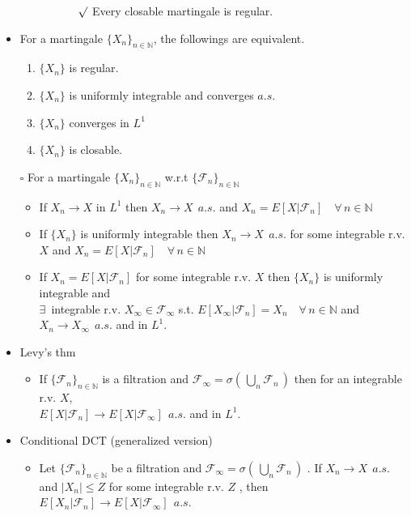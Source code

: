 \documentclass[12pt, A4]{article}
\newcommand{\sq}{$\square$}
\newcommand{\rmk}{$\surd$}
\newcommand{\N}{\mathbb{N}}
\newcommand{\F}{\mathcal{F}}
\newcommand{\exist}{\exists\,}
\newcommand{\foranyn}{\quad \forall \, n\in \N}
\begin{document}
\begin{itemize}
\begin{itemize}
\begin{enumerate}
			\begin{itemize}
				\item[\rmk] Every closable martingale is regular.
			\end{itemize}
		\end{enumerate}
	\end{itemize}
	\item For a martingale $\{X_n\}_{n\in \N}$, the followings are equivalent.
	\begin{enumerate}
		\item $\{X_n\}$ is regular.
		\item $\{X_n\}$ is uniformly integrable and converges $a.s.$
		\item $\{X_n\}$ converges in $L^1$
		\item $\{X_n\}$ is closable. 
	\end{enumerate}
	\item[\sq] For a martingale $\{X_n\}_{n\in \N}$ w.r.t $\{\F_n\}_{n\in \N}$
	\begin{itemize}
		\item If $X_n\rightarrow X$ in $L^1$ then $X_n\rightarrow X\;\, a.s.$ and $X_n=E[X|\F_n]\foranyn$
		\item If $\{X_n\}$ is uniformly integrable then $X_n\rightarrow X\;\, a.s.$ for some integrable r.v. $X$ and $X_n=E[X|\F_n]\foranyn$
		\item If $X_n=E[X|\F_n]$ for some integrable r.v. $X$ then $\{X_n\}$ is uniformly integrable and \\ $\exist$ integrable r.v. $X_\infty\in \F_\infty $ s.t. $E[X_\infty |\F_n]=X_n \foranyn$ and $X_n\rightarrow X_\infty\;\, a.s.$ and in $L^1$.
	\end{itemize} 
	\item Levy's thm
	\begin{itemize}
		\item If $\{\F_n\}_{n\in \N}$ is a filtration and $\F_\infty=\sigma(\,\bigcup_n \F_n\,)$ then for an integrable r.v. $X$, \\ $E[X|\F_n]\rightarrow E[X|\F_\infty]\;\,a.s.$ and in $L^1$.
	\end{itemize}
	\item Conditional DCT (generalized version)
	\begin{itemize}
		\item Let $\{\F_n\}_{n\in \N}$ be a filtration and $\F_\infty=\sigma(\,\bigcup_n \F_n\,)$ . If $X_n\rightarrow X\;\,a.s.$ and $|X_n|\leq Z$ for some integrable r.v. $Z$ , then $E[X_n|\F_n]\rightarrow E[X|\F_\infty]\;\,a.s.$ 
	\end{itemize} 

\end{itemize}
\end{document}
